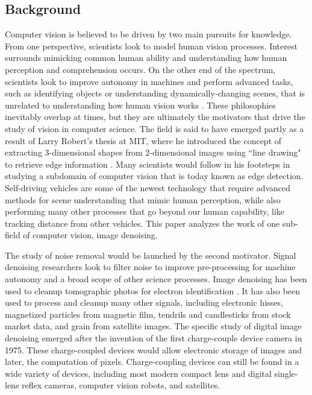 \documentclass{ncjms}
\begin{document}
\subsection{Background}
Computer vision is believed to be driven by two main pursuits for knowledge. From one perspective, scientists look to model human vision processes. Interest surrounds mimicking common human ability and understanding how human perception and comprehension occurs. On the other end of the spectrum, scientists look to improve autonomy in machines and perform advanced tasks, such as identifying objects or understanding dynamically-changing scenes, that is unrelated to understanding how human vision works \citep{zhang}. These philosophies inevitably overlap at times, but they are ultimately the motivators that drive the study of vision in computer science. The field is said to have emerged partly as a result of Larry Robert's thesis at MIT, where he introduced the concept of extracting 3-dimensional shapes from 2-dimensional images using ``line drawing" to retrieve edge information \citep{larry}. Many scientists would follow in his footsteps in studying a subdomain of computer vision that is today known as edge detection. Self-driving vehicles are some of the newest technology that require advanced methods for scene understanding that mimic human perception, while also performing many other processes that go beyond our human capability, like tracking distance from other vehicles. This paper analyzes the work of one sub-field of computer vision, image denoising.

The study of noise removal would be launched by the second motivator. Signal denoising researchers look to filter noise to improve pre-processing for machine autonomy and a broad scope of other science processes. Image denoising has been used to cleanup tomographic photos for electron identification \citep{fernandez}. It has also been used to process and cleanup many other signals, including electronic hisses, magnetized particles from magnetic film, tendrils and candlesticks from stock market data, and grain from satellite images. The specific study of digital image denoising emerged after the invention of the first charge-couple device camera in 1975. These charge-coupled devices would allow electronic storage of images and later, the computation of pixels. Charge-coupling devices can still be found in a wide variety of devices, including most modern compact lens and digital single-lens reflex cameras, computer vision robots, and satellites.
\end{document}
